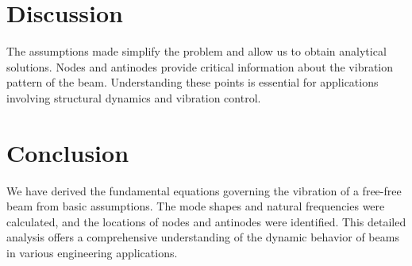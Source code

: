 \documentclass[12pt,a4paper]{article}
\begin{document}
\section{Discussion}
The assumptions made simplify the problem and allow us to obtain analytical solutions. Nodes and antinodes provide critical information about the vibration pattern of the beam. Understanding these points is essential for applications involving structural dynamics and vibration control.

\section{Conclusion}
We have derived the fundamental equations governing the vibration of a free-free beam from basic assumptions. The mode shapes and natural frequencies were calculated, and the locations of nodes and antinodes were identified. This detailed analysis offers a comprehensive understanding of the dynamic behavior of beams in various engineering applications.
\end{document}
